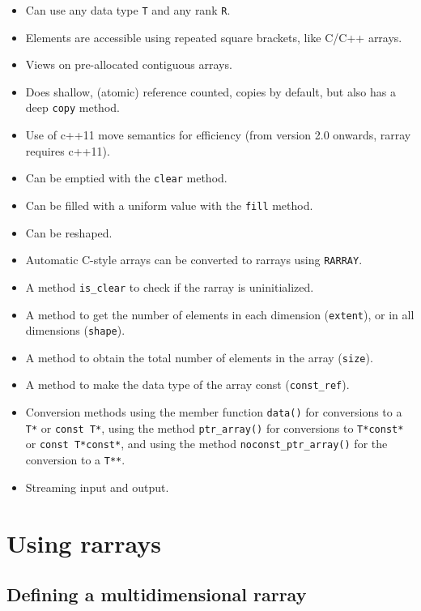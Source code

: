 \documentclass[11pt,twoside]{article}
\begin{document}
\begin{itemize}\itemsep0pt\parskip2pt
\item Can use any data type {\tt T} and any rank {\tt R}.
\item Elements are accessible using repeated square brackets, like C/C++ arrays.
\item Views on pre-allocated contiguous arrays.
\item Does shallow, (atomic) reference counted, copies by default, but also has a deep {\tt copy}
  method.
\item Use of c++11 move semantics for efficiency (from version 2.0
  onwards, rarray requires c++11).
\item Can be emptied with the {\tt clear} method.
\item Can be filled with a uniform value with the {\tt fill} method.
\item Can be reshaped.
\item Automatic C-style arrays can be converted to rarrays using {\tt RARRAY}.
\item A method {\tt is\_clear} to check if the rarray is uninitialized.
\item A method to get the number of elements in each
  dimension (\texttt{extent}), or in all dimensions (\texttt{shape}).
\item A method to obtain the total number of elements in the
  array (\texttt{size}).
\item A method to make the data type of the array const
  (\texttt{const\_ref}).
\item Conversion methods using the member
  function \texttt{data()} for conversions to a \texttt{T*} or
  \texttt{const T*}, using the method \texttt{ptr\_array()} for
  conversions to \texttt{T*const*} or \texttt{const T*const*}, and
  using the method \texttt{noconst\_ptr\_array()} for the conversion to a
  \texttt{T**}.
\item Streaming input and output.
\end{itemize}

\section{Using rarrays}

\subsection{Defining a multidimensional rarray}
\label{definerarray}
\end{document}
